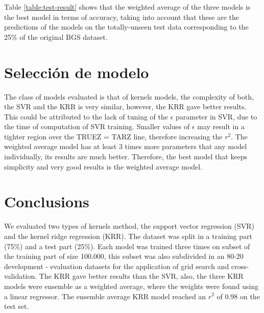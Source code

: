 Table \ref{table:test-result} shows that the weighted average of the three models is the best model in terms of accuracy, taking into account that these are the predictions of the models on the totally-unseen test data corresponding to the 25\% of the original BGS dataset. 
\section{Selección de modelo}

The class of models evaluated is that of kernels models, the complexity of both, the SVR and the KRR is very similar, however, the KRR gave better results. This could be attributed to the lack of tuning of the $\epsilon$ parameter in SVR, due to the time of computation of SVR training. Smaller values of $\epsilon$ may result in a tighter region over the TRUEZ = TARZ line, therefore increasing the $r^2$. The weighted average model has at least 3 times more parameters that any model individually, its results are much better. Therefore, the best model that keeps simplicity and very good results is the weighted average model. 

\section{Conclusions}

We evaluated two types of kernels method, the support vector regression (SVR) and the kernel ridge regression (KRR). The dataset was split in a training part (75\%) and a test part (25\%). Each model was trained three times on subset of the training part of size 100.000, this subset was also subdivided in an 80-20 development - evaluation datasets for the application of grid search and cross-validation. The KRR gave better results than the SVR, also, the three KRR models were ensemble as a weighted average, where the weights were found using a linear regressor. The ensemble average KRR model reached an $r^2$ of 0.98 on the test set. 